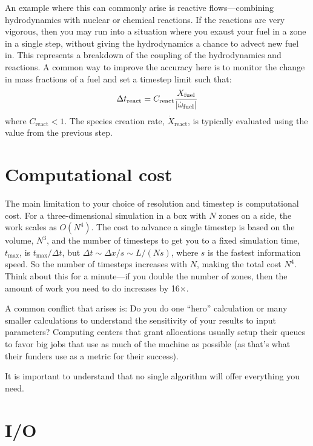 An example where this can commonly arise is reactive flows---combining
hydrodynamics with nuclear or chemical reactions.  If the reactions
are very vigorous, then you may run into a situation where you exaust
your fuel in a zone in a single step, without giving the hydrodynamics
a chance to advect new fuel in.  This represents a breakdown of the
coupling of the hydrodynamics and reactions.  A common way to improve
the accuracy here is to monitor the change in mass fractions of a fuel
and set a timestep limit such that:
\begin{equation}
\Delta t_\mathrm{react} = C_\mathrm{react}
\frac{X_\mathrm{fuel}}{|{\dot{\omega}}_\mathrm{fuel}|}
\end{equation}
where $C_\mathrm{react} < 1$.  The species creation rate,
$\dot{X}_\mathrm{react}$, is typically evaluated using the value from
the previous step.



\section{Computational cost}

The main limitation to your choice of resolution and timestep is
computational cost.  For a three-dimensional simulation in a box with
$N$ zones on a side, the work scales as $O(N^4)$.  The cost to advance
a single timestep is based on the volume, $N^3$, and the number of
timesteps to get you to a fixed simulation time, $t_\mathrm{max}$, is
$t_\mathrm{max}/\Delta t$, but $\Delta t \sim \Delta x / s \sim L/(N
s)$, where $s$ is the fastest information speed.  So the number 
of timesteps increases with $N$, making the total cost $N^4$.
Think about this for a minute---if you double the number of zones, then
the amount of work you need to do increases by 16$\times$.

A common conflict that arises is: Do you do one ``hero'' calculation
or many smaller calculations to understand the sensitivity of your
results to input parameters?  Computing centers that grant allocations
usually setup their queues to favor big jobs that use as much of the
machine as possible (as that's what their funders use as a metric for
their success).


It is important to understand that no single algorithm will offer everything
you need.


\section{I/O}


